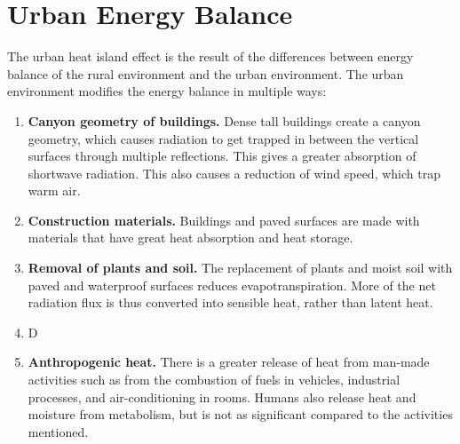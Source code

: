 \section{Urban Energy Balance}
	The urban heat island effect is the result of the differences between energy balance of the rural environment and the urban environment.
	The urban environment modifies the energy balance in multiple ways:
	\begin{enumerate}
		\item \textbf{Canyon geometry of buildings.}
		Dense tall buildings create a canyon geometry,
			which causes radiation to get trapped in between the vertical surfaces through multiple reflections.
		This gives a greater absorption of shortwave radiation.
		This also causes a reduction of wind speed, which trap warm air.
		
		\item \textbf{Construction materials.}
		Buildings and paved surfaces are made with materials that have great heat absorption and heat storage.
		
		\item \textbf{Removal of plants and soil.}
		The replacement of plants and moist soil with paved and waterproof surfaces reduces evapotranspiration.
		More of the net radiation flux is thus converted into sensible heat, rather than latent heat.
		
		\item D
		
		\item \textbf{Anthropogenic heat.}
		There is a greater release of heat from man-made activities such as from
			the combustion of fuels in vehicles,
			industrial processes, and
			air-conditioning in rooms.
		Humans also release heat and moisture from metabolism, but is not as significant compared to the activities mentioned.
	\end{enumerate}

